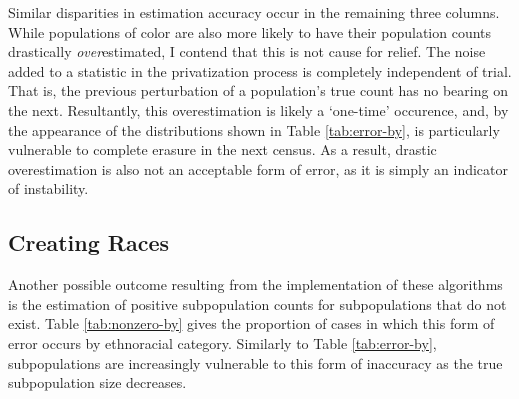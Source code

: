 Similar disparities in estimation accuracy occur in the remaining three columns. While populations of color are also more likely to have their population counts drastically \textit{over}estimated, I contend that this is not cause for relief. The noise added to a statistic in the privatization process is completely independent of trial. That is, the previous perturbation of a population's true count has no bearing on the next. Resultantly, this overestimation is likely a `one-time' occurence, and, by the appearance of the distributions shown in Table \ref{tab:error-by}, is particularly vulnerable to complete erasure in the next census. As a result, drastic overestimation is also not an acceptable form of error, as it is simply an indicator of  instability.



\subsection{Creating Races}\label{sec:create}

Another possible outcome resulting from the implementation of these algorithms is the estimation of positive subpopulation counts for subpopulations that do not exist. Table \ref{tab:nonzero-by} gives the proportion of cases in which this form of error occurs by ethnoracial category. Similarly to Table \ref{tab:error-by}, subpopulations are increasingly vulnerable to this form of inaccuracy as the true subpopulation size decreases.

















